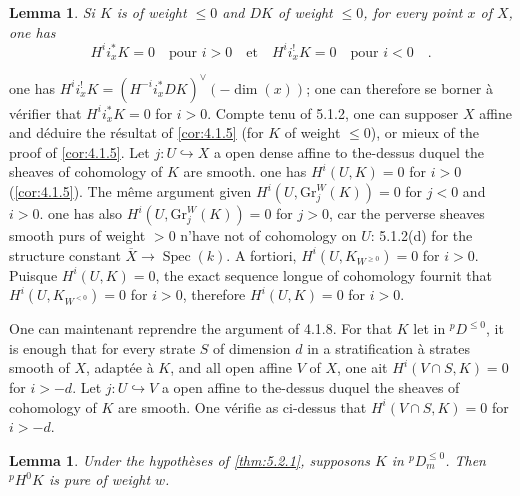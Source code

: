 \documentclass[12pt,a4paper]{article}
\theoremstyle{plain}
\newtheorem{lemma}[theorem]{Lemma}
\theoremstyle{definition}
\DeclareMathOperator{\Spec}{Spec}
\newcommand{\into}{\hookrightarrow}
\providecommand{\Spec}{\operatorname{Spec}}
\begin{document}
{{\begin{lemma}\label{lem:5.2.2}
Si $K$ is of weight $\leq 0$ and $DK$ of weight $\leq 0$, for every point $x$ of $X$, one has
\[
H^{i}i_{x}^{*}K = 0 \quad \text{pour } i > 0 \quad \text{et} \quad H^{i}i_{x}^{!}K = 0 \quad \text{pour } i < 0\quad.
\]
\end{lemma}

one has $H^{i}i_{x}^{!}K = (H^{-i}i_{x}^{*}DK)^{\vee}(-\dim(x))$; one can therefore se borner \`{a} v\'{e}rifier that $H^{i}i_{x}^{*}K = 0$ for $i > 0$. Compte tenu of 5.1.2, one can supposer $X$ affine and d\'{e}duire the r\'{e}sultat of \ref{cor:4.1.5} (for $K$ of weight $\leq 0$), or mieux of the proof of \ref{cor:4.1.5}. Let $j: U \into X$ a open dense affine to the-dessus duquel the sheaves of cohomology of $K$ are smooth. one has $H^{i}(U, K) = 0$ for $i > 0$ (\ref{cor:4.1.5}). The m\^{e}me argument given $H^{i}(U, \mathrm{Gr}_{j}^{W}(K)) = 0$ for $j < 0$ and $i > 0$. one has also $H^{i}(U, \mathrm{Gr}_{j}^{W}(K)) = 0$ for $j > 0$, car the perverse sheaves smooth purs of weight $> 0$ n'have not of cohomology on $U$: 5.1.2(d) for the structure constant $\overline{X} \to \Spec(k)$. A fortiori, $H^{i}(U, K_{W^{\geq 0}}) = 0$ for $i > 0$. Puisque $H^{i}(U, K) = 0$, the exact sequence longue of cohomology fournit that $H^{i}(U, K_{W^{<0}}) = 0$ for $i > 0$, therefore $H^{i}(U, K) = 0$ for $i > 0$.

One can maintenant reprendre the argument of 4.1.8. For that $K$ let in ${}^{p}D^{\leq 0}$, it is enough that for every strate $S$ of dimension $d$ in a stratification \`{a} strates smooth of $X$, adapt\'{e}e \`{a} $K$, and all open affine $V$ of $X$, one ait $H^{i}(V \cap S, K) = 0$ for $i > -d$. Let $j: U \into V$ a open affine to the-dessus duquel the sheaves of cohomology of $K$ are smooth. One v\'{e}rifie as ci-dessus that $H^{i}(V \cap S, K) = 0$ for $i > -d$.

\begin{lemma}\label{lem:5.2.3}
Under the hypoth\`{e}ses of \ref{thm:5.2.1}, supposons $K$ in ${}^{p}D_{m}^{\leq 0}$. Then ${}^{p}H^{0}K$ is pure of weight $w$.
\end{lemma}

}}
\end{document}
